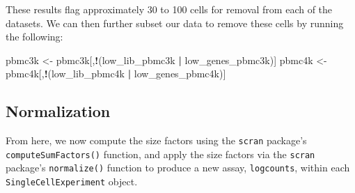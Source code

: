 \documentclass[]{book}
\newenvironment{Shaded}{\begin{snugshade}}{\end{snugshade}}
\newcommand{\CommentTok}[1]{\textcolor[rgb]{0.56,0.35,0.01}{\textit{#1}}}
\newcommand{\DataTypeTok}[1]{\textcolor[rgb]{0.13,0.29,0.53}{#1}}
\newcommand{\DecValTok}[1]{\textcolor[rgb]{0.00,0.00,0.81}{#1}}
\newcommand{\KeywordTok}[1]{\textcolor[rgb]{0.13,0.29,0.53}{\textbf{#1}}}
\newcommand{\NormalTok}[1]{#1}
\newcommand{\OperatorTok}[1]{\textcolor[rgb]{0.81,0.36,0.00}{\textbf{#1}}}
\newcommand{\StringTok}[1]{\textcolor[rgb]{0.31,0.60,0.02}{#1}}
\begin{document}
\begin{Shaded}
\end{Shaded}

These results flag approximately 30 to 100 cells for removal from each of the datasets. We can then further subset our data to remove these cells by running the following:

\begin{Shaded}
\begin{Highlighting}[]
\NormalTok{pbmc3k <-}\StringTok{ }\NormalTok{pbmc3k[,}\OperatorTok{!}\NormalTok{(low_lib_pbmc3k }\OperatorTok{|}\StringTok{ }\NormalTok{low_genes_pbmc3k)]}
\NormalTok{pbmc4k <-}\StringTok{ }\NormalTok{pbmc4k[,}\OperatorTok{!}\NormalTok{(low_lib_pbmc4k }\OperatorTok{|}\StringTok{ }\NormalTok{low_genes_pbmc4k)]}
\end{Highlighting}
\end{Shaded}

\hypertarget{normalization}{%
\subsection{Normalization}\label{normalization}}

From here, we now compute the size factors using the \texttt{scran} package's \texttt{computeSumFactors()} function, and apply the size factors via the \texttt{scran} package's \texttt{normalize()} function to produce a new assay, \texttt{logcounts}, within each \texttt{SingleCellExperiment} object.
\end{document}
